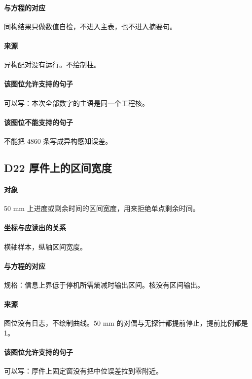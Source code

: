 \paragraph{与方程的对应}
同构结果只做数值自检，不进入主表，也不进入摘要句。

\paragraph{来源}
异构配对没有运行。不绘制柱。

\paragraph{该图位允许支持的句子}
可以写：本次全部数字的主语是同一个工程核。

\paragraph{该图位不能支持的句子}
不能把 4860 条写成异构感知误差。

\subsection{D22 厚件上的区间宽度}
\paragraph{对象}
50 mm 上进度或剩余时间的区间宽度，用来拒绝单点剩余时间。

\paragraph{坐标与应读出的关系}
横轴样本，纵轴区间宽度。

\paragraph{与方程的对应}
规格：信息上界低于停机所需熵减时输出区间。核没有区间输出。

\paragraph{来源}
图位没有日志，不绘制曲线。50 mm 的对偶与无探针都提前停止，提前比例都是 1。

\paragraph{该图位允许支持的句子}
可以写：厚件上固定窗没有把中位误差拉到零附近。

